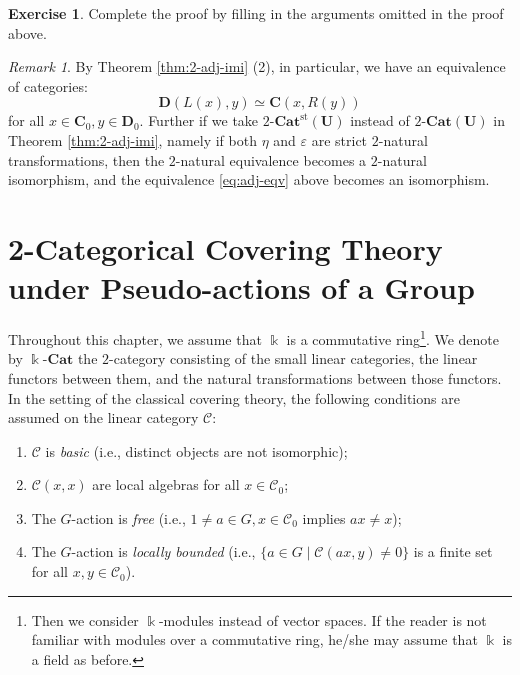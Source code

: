\documentclass{surv-l}
\numberwithin{equation}{chapter}
\numberwithin{figure}{chapter}
\theoremstyle{plain}
\theoremstyle{definition}
\newtheorem{exc}[thm]{Exercise}
\theoremstyle{remark}
\newtheorem{rmk}[thm]{Remark}
\newcommand{\kCat}{\Bbbk\text{-}\mathbf{Cat}}
\newcommand{\twoCat}{2\text{-}\mathbf{Cat}}
\newcommand{\twoCatst}{2\text{-}\mathbf{Cat}^{\mathrm{st}}}
\begin{document}
\begin{exc}
Complete the proof by filling in the arguments omitted in the proof above.
\end{exc}

\begin{rmk}\label{rmk:2-adj-imi}
By Theorem \ref{thm:2-adj-imi} (2), in particular, we have
an equivalence of categories:
\begin{equation}
\label{eq:adj-eqv}
\mathbf{D}(L(x), y) \simeq \mathbf{C}(x, R(y))
\end{equation}
for all $x \in \mathbf{C}_0, y \in \mathbf{D}_0$.
Further if we take $\twoCatst(\mathbf{U})$ instead of $\twoCat(\mathbf{U})$
in Theorem \ref{thm:2-adj-imi}, namely if both $\eta$ and $\varepsilon$ are
strict $2$-natural transformations, then
the $2$-natural equivalence becomes a $2$-natural isomorphism,
and the equivalence \eqref{eq:adj-eqv} above becomes an isomorphism.
\end{rmk}



\chapter[2-Categorical Covering Theory under Pseudo-actions]{2-Categorical Covering Theory under Pseudo-actions of a
  Group}\label{ch:2-cov}\label{ch:5}
Throughout this chapter, we assume that $\Bbbk$ is a commutative ring\footnote{Then we consider $\Bbbk$-modules instead of vector spaces.
If the reader is not familiar with modules over a commutative ring,
he/she may assume that $\Bbbk$ is a field as before.
}.
We denote by $\kCat$ the $2$-category consisting of
the small linear categories, the linear functors between them,
and the natural transformations between those functors.
In the setting of the classical covering theory,
the following conditions are assumed on the linear category ${\mathcal{C}}$:

\begin{enumerate}
\item
${\mathcal{C}}$ is \emph{basic}
(i.e., distinct objects are not isomorphic);
\item
${\mathcal{C}}(x,x)$ are local algebras for all $x \in {\mathcal{C}}_0$;
\item
The $G$-action is \emph{free}
(i.e., $1\ne a \in G, x\in {\mathcal{C}}_0$ implies $a x \ne x$);
\item
The $G$-action is \emph{locally bounded}
(i.e., $\{a\in G\mid {\mathcal{C}}(a x, y)\ne 0\}$ is a finite set
for all $x, y \in {\mathcal{C}}_0$).
\end{enumerate}
\end{document}
